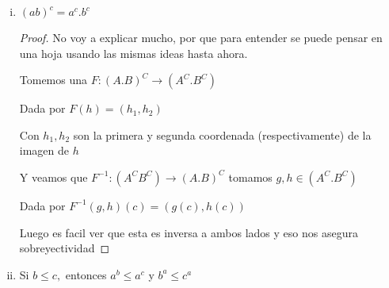 \documentclass[12pt]{article}
\newcommand{\Ra}{\Rightarrow}
\newcommand{\ra}{\rightarrow}
\theoremstyle{definition}
\begin{document}
\begin{enumerate}[i.]
    \begin{proof}
      Este puede parecer confuso en un principio pero dejo aquí la idea correcta para que lo piensen.

      Necesito una función biyectiva $F: (A^B)^C \ra A^{B \times C}$ 

      Consideremos $h \in (A^B)^C$ y $(b,c) \in (B \times C)$ 

      Podemos definir $F(h)(b,c) = h(c)(b)$ esto significa  'el resultado de evaluar $F$ en una función es otra función que puede ser evaluada en una tupla $(b,c)$'

      Esto tiene sentido por que $F$ recibe funciones y las manda a funciones que deben poder recibir tuplas.

      Con estas dos ideas deberia alcanzar para que el lector pueda entender la validez de la demostración

      Ahora faltaría ver que es biyectiva. Veamos que es facil encontrar una inversa 

      Sea $k \in A^{B \times C}$ y $b \in B, c \in C$ tenemos $ F^{-1}(k)(c)(b) = k(b,c) $

      Ahora veamos que es inversa.

    $F^{-1}(F(h))(c)(b) = F(h)(b,c) = h(c)(b) \Ra F^{-1}(F(h)) = h \quad \forall h \in (A^{B})^C$

      $F(F^{-1}(k))(b,c) = F^{-1}(k)(c)(b) = k(b,c) \Ra F(F^{-1}(k)) = k \quad \forall k \in A^{B \times C}$

      Efectivamente $F$ es biyectiva
    \end{proof}
  \item $(ab)^c = a^c.b^c$
    \begin{proof}
     No voy a explicar mucho, por que para entender se puede pensar en una hoja usando las mismas ideas hasta ahora.

     Tomemos una $F: (A.B)^C \ra (A^C.B^C)$ 

     Dada por $F(h) = (h_{1}, h_{2})$ 

     Con $h_{1},h_{2}$ son la primera y segunda coordenada (respectivamente) de la imagen de $h$

   Y veamos que $F^{-1}: (A^C B^C) \ra (A.B)^C$ tomamos $g,h \in (A^C.B^C)$

     Dada por $F^{-1}(g,h)(c) = (g(c),h(c)) $ 

Luego es facil ver que esta es inversa a ambos lados y eso nos asegura sobreyectividad
    \end{proof}
  \item Si $b \leq c,$ entonces $a^b \leq a^c$ y $b^a \leq c^a$
\end{enumerate}
\end{document}
